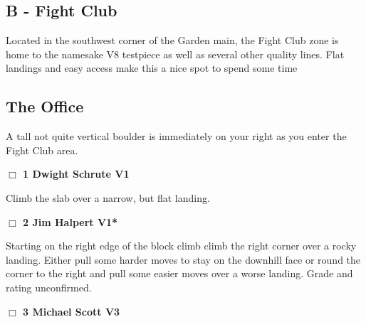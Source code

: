 	\begin{multicols}{2}


\section{B - Fight Club}\label{sa:Fight Club}

Located in the southwest corner of the Garden main, the Fight Club zone is home to the namesake V8 testpiece as well as several other quality lines. Flat landings and easy access make this a nice spot to spend some time\\




\needspace{10em}
\subsection*{The Office}\label{bf:The Office}

A tall not quite vertical boulder is immediately on your right as you enter the Fight Club area.\\



\needspace{2em}
\label{rt:Dwight Schrute}
\colorbox{green!20}{
\parbox{0.95\linewidth}{
\hspace{-1ex}\textbf{$\Box$
1 Dwight Schrute V1  \warn
}}}
\begin{adjustwidth}{1.3em}{}			

Climb the slab over a narrow, but flat landing.
\end{adjustwidth}




\needspace{2em}
\label{rt:Jim Halpert}
\colorbox{green!20}{
\parbox{0.95\linewidth}{
\hspace{-1ex}\textbf{$\Box$
2 Jim Halpert V1*  \warn\warn
}}}
\begin{adjustwidth}{1.3em}{}			

Starting on the right edge of the block climb climb the right corner over a rocky landing. Either pull some harder moves to stay on the downhill face or round the corner to the right and pull some easier moves over a worse landing. Grade and rating unconfirmed.
\end{adjustwidth}




\needspace{2em}
\label{rt:Michael Scott}
\colorbox{green!20}{
\parbox{0.95\linewidth}{
\hspace{-1ex}\textbf{$\Box$
3 Michael Scott V3  \warn
}}}
\begin{adjustwidth}{1.3em}{}			


\end{adjustwidth}
\end{multicols}
